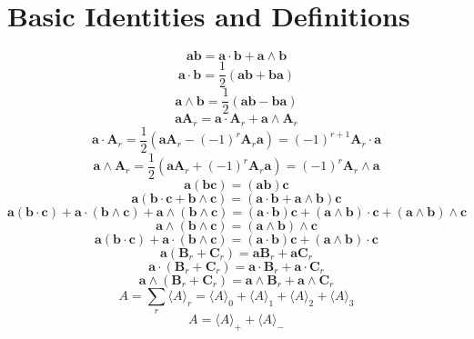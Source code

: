 \documentclass[11pt, a4paper, fleqn]{report}
\numberwithin{equation}{section}
\def\*#1{\mathbf{#1}}
\begin{document}
\section{Basic Identities and Definitions}
\begin{equation}
    \*a\*b=\*a\cdot\*b+\*a\wedge\*b
\end{equation}
\begin{equation}
    \*a\cdot\*b=\frac{1}{2}(\*a\*b+\*b\*a)
\end{equation}
\begin{equation}
    \*a\wedge\*b=\frac{1}{2}(\*a\*b-\*b\*a)
\end{equation}
\begin{equation}
    \*a\*A_r=\*a\cdot\*A_r+\*a\wedge\*A_r
\end{equation}
\begin{equation}
    \*a\cdot\*A_r=\frac{1}{2}(\*a\*A_r-(-1)^r\*A_r\*a)=(-1)^{r+1}\*A_r\cdot\*a
\end{equation}
\begin{equation}
    \*a\wedge\*A_r=\frac{1}{2}(\*a\*A_r+(-1)^r\*A_r\*a)=(-1)^{r}\*A_r\wedge\*a
\end{equation}
\[
    \*a(\*b\*c)=(\*a\*b)\*c
\]
\[
    \*a(\*b\cdot\*c+\*b\wedge\*c)=(\*a\cdot\*b+\*a\wedge\*b)\*c
\]
\[
    \*a(\*b\cdot\*c)+\*a\cdot(\*b\wedge\*c)+\*a\wedge(\*b\wedge\*c)=(\*a\cdot\*b)\*c+(\*a\wedge\*b)\cdot\*c+(\*a\wedge\*b)\wedge\*c
\]
\begin{equation}
    \*a\wedge(\*b\wedge\*c)=(\*a\wedge\*b)\wedge\*c
\end{equation}
\begin{equation}
    \*a(\*b\cdot\*c)+\*a\cdot(\*b\wedge\*c)=(\*a\cdot\*b)\*c+(\*a\wedge\*b)\cdot\*c
\end{equation}
\[
    \*a(\*B_r+\*C_r)=\*a\*B_r+\*a\*C_r
\]
\begin{equation}\tag{2.1.9a}
    \*a\cdot(\*B_r+\*C_r)=\*a\cdot\*B_r+\*a\cdot\*C_r
\end{equation}
\begin{equation}\tag{2.1.9b}
    \*a\wedge(\*B_r+\*C_r)=\*a\wedge\*B_r+\*a\wedge\*C_r
\end{equation}
\setcounter{equation}{9}%
\begin{equation}
    A=\sum_r\langle A\rangle_r=\langle A\rangle_0+\langle A\rangle_1+\langle A\rangle_2+\langle A\rangle_3
\end{equation}
\begin{equation}\tag{2.1.11a}
    A=\langle A\rangle_++\langle A\rangle_-
\end{equation}
\end{document}
